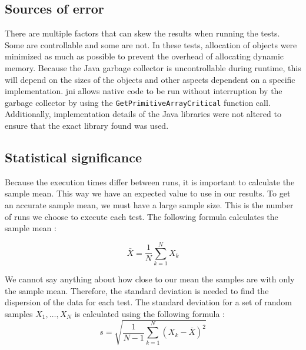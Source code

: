 \subsection{Sources of error}
There are multiple factors that can skew the results when running the tests. Some are controllable and some are not. In these tests, allocation of objects were minimized as much as possible to prevent the overhead of allocating dynamic memory. Because the Java garbage collector is uncontrollable during runtime, this will depend on the sizes of the objects and other aspects dependent on a specific implementation. \gls{jni} allows native code to be run without interruption by the garbage collector by using the \texttt{GetPrimitiveArrayCritical} function call. Additionally, implementation details of the Java libraries were not altered to ensure that the exact library found was used.


\subsection{Statistical significance}
Because the execution times differ between runs, it is important to calculate the sample mean. This way we have an expected value to use in our results. To get an accurate sample mean, we must have a large sample size. This is the number of runs we choose to execute each test. The following formula calculates the sample mean \cite[p.263]{olofsson2012probability}:

\begin{equation*}
    \bar{X} = \frac{1}{N} \sum\limits_{k = 1}^{N} X_k
\end{equation*}

We cannot say anything about how close to our mean the samples are with only the sample mean. Therefore, the standard deviation is needed to find the dispersion of the data for each test. The standard deviation for a set of random samples $X_1, \dots, X_N$ is calculated using the following formula \cite[p.~302]{olofsson2012probability}:
\begin{equation*}
    s = \sqrt{\frac{1}{N - 1} \sum\limits_{k = 1}^{N}\left(X_k - \bar{X}\right)^2}
\end{equation*}

